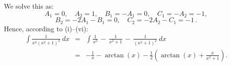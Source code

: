 \documentclass[11pt]{article}
\newcommand{\ds}{\displaystyle}
\begin{document}
We solve this as:
$$
A_1 = 0, \quad A_2 = 1, \quad B_1 = -A_1 = 0, \quad C_1 = -A_2 = -1, 
$$
$$
B_2 = -2A_1 - B_1 = 0, \quad 
C_2 = -2A_2 - C_1 =  -1\,.
$$
Hence, according to (i)--(vi):
$$\begin{array}{rcl}
\ds\int\! \frac1{x^2(x^2+1)^2}\ dx
&=&
\ds\int\!\frac{1}{x^2} \, {-}\,  \frac{1}{x^2+1}\, {-}\,  \frac{1}{(x^2+1)^2}\ dx
\\[1em]
&=&
\ds-\frac1x - \arctan(x) - \frac12\!\left(\arctan(x) + \frac{x}{x^2+1}\right).
\end{array}$$


\pagebreak
\end{document}
